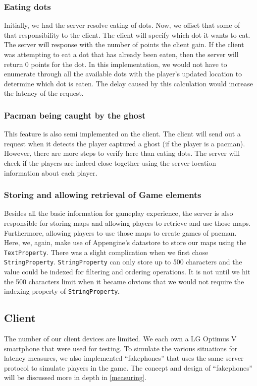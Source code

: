 \documentclass{acm_proc_article-sp}
\begin{document}
\subsubsection{Eating dots}
Initially, we had the server resolve eating of dots. Now, we offset
that some of that responsibility to the client. The client will
specify which dot it wants to eat. The server will response with the
number of points the client gain. If the client was attempting to eat
a dot that has already been eaten, then the server will return 0
points for the dot. In this implementation, we would not have to
enumerate through all the available dots with the player's updated
location to determine which dot is eaten. The delay caused by this
calculation would increase the latency of the request.

\subsubsection{Pacman being caught by the ghost}
This feature is also semi implemented on the client. The client will
send out a request when it detects the player captured a ghost (if the
player is a pacman). However, there are more steps to verify here than
eating dots. The server will check if the players are indeed close
together using the server location information about each player.

\subsubsection{Storing and allowing retrieval of Game elements}
Besides all the basic information for gameplay experience, the server
is also responsible for storing maps and allowing players to retrieve
and use those maps. Furthermore, allowing players to use those maps to
create games of pacman. Here, we, again, make use of Appengine's
datastore to store our maps using the \texttt{TextProperty}. There was
a slight complication when we first chose
\texttt{StringProperty}. \texttt{StringProperty} can only store up to
500 characters and the value could be indexed for filtering and
ordering operations. It is not until we hit the 500 characters limit
when it became obvious that we would not require the indexing property
of \texttt{StringProperty}.


\subsection{Client}

The number of our client devices are limited. We each own a LG Optimus
V smartphone that were used for testing. To simulate the various
situations for latency measures, we also implemented ``fakephones''
that uses the same server protocol to simulate players in the
game. The concept and design of ``fakephones'' will be discussed more
in depth in \ref{measuring}.
\end{document}
